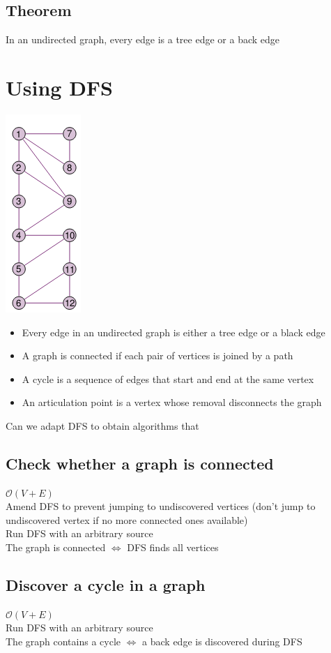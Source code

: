 \documentclass{article}[18pt]
\begin{document}
\subsection{Theorem}
In an undirected graph, every edge is a tree edge or a back edge
\section{Using DFS}
\begin{center}
	\includegraphics[scale=0.7]{"Using DFS"}
\end{center}
\begin{itemize}
	\item Every edge in an undirected graph is either a tree edge or a black edge
	\item A graph is connected if each pair of vertices is joined by a path
	\item A cycle is a sequence of edges that start and end at the same vertex
	\item An articulation point is a vertex whose removal disconnects the graph
\end{itemize}
Can we adapt DFS to obtain algorithms that
\subsection{Check whether a graph is connected}
$\mathcal{O}(V+E)$\\
Amend DFS to prevent jumping to undiscovered vertices (don't jump to undiscovered vertex if no more connected ones available)\\
Run DFS with an arbitrary source\\
The graph is connected $\Leftrightarrow$ DFS finds all vertices
\subsection{Discover a cycle in a graph}
$\mathcal{O}(V+E)$\\
Run DFS with an arbitrary source\\
The graph contains a cycle $\Leftrightarrow$ a back edge is discovered during DFS
\end{document}
